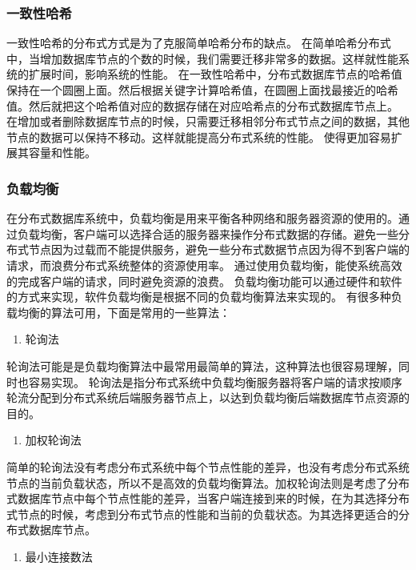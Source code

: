 \subsubsection{一致性哈希}
一致性哈希的分布式方式是为了克服简单哈希分布的缺点。
在简单哈希分布式中，当增加数据库节点的个数的时候，我们需要迁移非常多的数据。这样就性能系统的扩展时间，影响系统的性能。
在一致性哈希中，分布式数据库节点的哈希值保持在一个圆圈上面。然后根据关键字计算哈希值，在圆圈上面找最接近的哈希值。然后就把这个哈希值对应的数据存储在对应哈希点的分布式数据库节点上。
在增加或者删除数据库节点的时候，只需要迁移相邻分布式节点之间的数据，其他节点的数据可以保持不移动。这样就能提高分布式系统的性能。
使得更加容易扩展其容量和性能。 
\subsubsection{负载均衡}
在分布式数据库系统中，负载均衡是用来平衡各种网络和服务器资源的使用的。通过负载均衡，客户端可以选择合适的服务器来操作分布式数据的存储。避免一些分布式节点因为过载而不能提供服务，避免一些分布式数据节点因为得不到客户端的请求，而浪费分布式系统整体的资源使用率。
通过使用负载均衡，能使系统高效的完成客户端的请求，同时避免资源的浪费。
负载均衡功能可以通过硬件和软件的方式来实现，软件负载均衡是根据不同的负载均衡算法来实现的。
有很多种负载均衡的算法可用，下面是常用的一些算法：



	\begin{enumerate}
		\item 轮询法
	\end{enumerate}

	轮询法可能是是负载均衡算法中最常用最简单的算法，这种算法也很容易理解，同时也容易实现。 
	轮询法是指分布式系统中负载均衡服务器将客户端的请求按顺序
	轮流分配到分布式系统后端服务器节点上，以达到负载均衡后端数据库节点资源的目的。 	

\begin{enumerate}[resume]
	\item 加权轮询法
\end{enumerate}

	简单的轮询法没有考虑分布式系统中每个节点性能的差异，也没有考虑分布式系统节点的当前负载状态，所以不是高效的负载均衡算法。加权轮询法则是考虑了分布式数据库节点中每个节点性能的差异，当客户端连接到来的时候，在为其选择分布式节点的时候，考虑到分布式节点的性能和当前的负载状态。为其选择更适合的分布式数据库节点。

\begin{enumerate}[resume]
	\item 最小连接数法
\end{enumerate}

